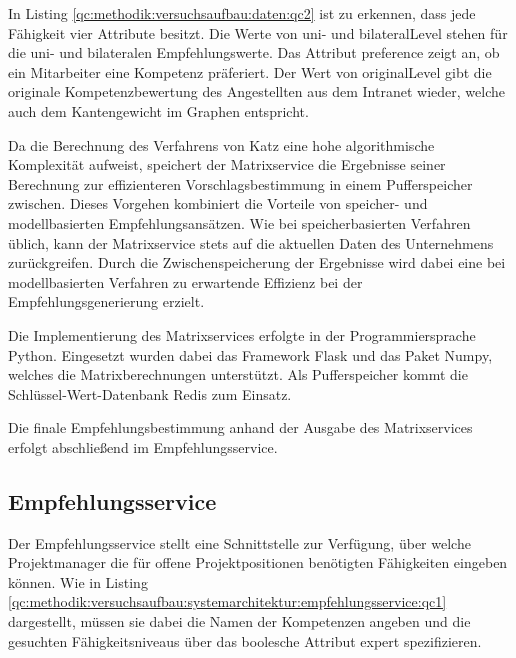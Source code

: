 In Listing \ref{qc:methodik:versuchsaufbau:daten:qc2} ist zu erkennen, dass jede Fähigkeit vier Attribute besitzt. Die Werte von uni- und bilateralLevel stehen für die uni- und bilateralen Empfehlungswerte. Das Attribut preference zeigt an, ob ein Mitarbeiter eine Kompetenz präferiert. Der Wert von originalLevel gibt die originale Kompetenzbewertung des Angestellten aus dem Intranet wieder, welche auch dem Kantengewicht im Graphen entspricht.

Da die Berechnung des Verfahrens von Katz eine hohe algorithmische Komplexität aufweist, speichert der Matrixservice die Ergebnisse seiner Berechnung zur effizienteren Vorschlagsbestimmung in einem Pufferspeicher zwischen. Dieses Vorgehen kombiniert die Vorteile von speicher- und modellbasierten Empfehlungsansätzen. Wie bei speicherbasierten Verfahren üblich, kann der Matrixservice stets auf die aktuellen Daten des Unternehmens zurückgreifen. Durch die Zwischenspeicherung der Ergebnisse wird dabei eine bei modellbasierten Verfahren zu erwartende Effizienz bei der Empfehlungsgenerierung erzielt.

Die Implementierung des Matrixservices erfolgte in der Programmiersprache Python. Eingesetzt wurden dabei das Framework Flask und das Paket Numpy, welches die Matrixberechnungen unterstützt. Als Pufferspeicher kommt die Schlüssel-Wert-Datenbank Redis zum Einsatz.

Die finale Empfehlungsbestimmung anhand der Ausgabe des Matrixservices erfolgt abschließend im Empfehlungsservice.

\subsection{Empfehlungsservice}
\label{ch:methodik:versuchsaufbau:systemarchitektur:empfehlungsservice}
Der Empfehlungsservice stellt eine Schnittstelle zur Verfügung, über welche Projektmanager die für offene Projektpositionen benötigten Fähigkeiten eingeben können. Wie in Listing \ref{qc:methodik:versuchsaufbau:systemarchitektur:empfehlungsservice:qc1} dargestellt, müssen sie dabei die Namen der Kompetenzen angeben und die gesuchten Fähigkeitsniveaus über das boolesche Attribut expert spezifizieren.



